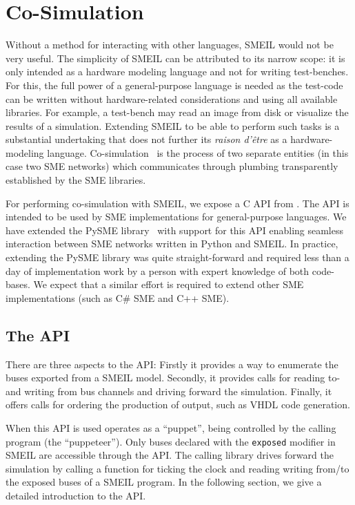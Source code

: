 \chapter{Co-Simulation}
\label{sec:cosim}

Without a method for interacting with other languages, SMEIL would not be very
useful. The simplicity of SMEIL can be attributed to its narrow scope: it is
only intended as a hardware modeling language and not for writing
test-benches. For this, the full power of a general-purpose language is needed
as the test-code can be written without hardware-related considerations and
using all available libraries. For example, a test-bench may read an image from
disk or visualize the results of a simulation. Extending SMEIL to be able to
perform such tasks is a substantial undertaking that does not further its
{\itshape raison d'être} as a hardware-modeling
language. Co-simulation~\cite{schloegl2015towards} is the process of two
separate entities (in this case two SME networks) which communicates through
plumbing transparently established by the SME libraries.

For performing co-simulation with SMEIL, we expose a C API from \libsme{}. The
API is intended to be used by SME implementations for general-purpose
languages. We have extended the PySME library~\cite{pysme} with support for this
API enabling seamless interaction between SME networks written in Python and
SMEIL. In practice, extending the PySME library was quite straight-forward and
required less than a day of implementation work by a person with expert
knowledge of both code-bases. We expect that a similar effort is required to
extend other SME implementations (such as C\# SME and C++ SME).

\section{The API}
There are three aspects to the API: Firstly it provides a way to enumerate the
buses exported from a SMEIL model. Secondly, it provides calls for reading to-
and writing from bus channels and driving forward the simulation. Finally, it
offers calls for ordering the production of output, such as VHDL code
generation.

When this API is used \libsme{} operates as a ``puppet'', being controlled by
the calling program (the ``puppeteer''). Only buses declared with the
\texttt{exposed} modifier in SMEIL are accessible through the
\libsme{} API. The calling library drives forward the simulation by calling a
function for ticking the clock and reading writing from/to the exposed buses of
a SMEIL program. In the following section, we give a detailed introduction to
the API.

